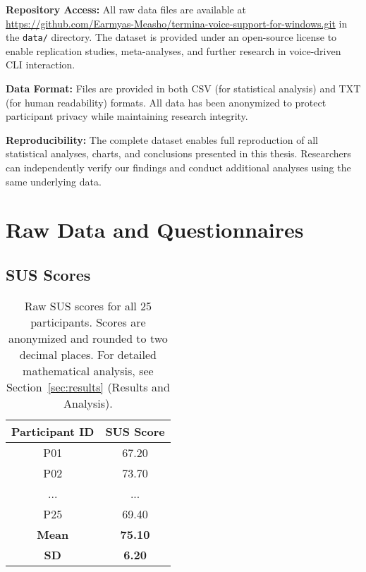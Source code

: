 \documentclass[a4paper,12pt]{article}
\begin{document}
\textbf{Repository Access:} All raw data files are available at \url{https://github.com/Earmyas-Measho/termina-voice-support-for-windows.git} in the \texttt{data/} directory. The dataset is provided under an open-source license to enable replication studies, meta-analyses, and further research in voice-driven CLI interaction.

\textbf{Data Format:} Files are provided in both CSV (for statistical analysis) and TXT (for human readability) formats. All data has been anonymized to protect participant privacy while maintaining research integrity.

\textbf{Reproducibility:} The complete dataset enables full reproduction of all statistical analyses, charts, and conclusions presented in this thesis. Researchers can independently verify our findings and conduct additional analyses using the same underlying data.

\clearpage
\appendix
{}
\setcounter{page}{1} %

\newpage
\section{Raw Data and Questionnaires}
\label{app:rawdata}

\subsection{SUS Scores}
\begin{table}[h!]
\centering
\begin{tabular}{|c|c|}
\hline
\textbf{Participant ID} & \textbf{SUS Score} \\
\hline
P01 & 67.20 \\
P02 & 73.70 \\
... & ... \\
P25 & 69.40 \\
\hline
\textbf{Mean} & \textbf{75.10} \\
\textbf{SD} & \textbf{6.20} \\
\hline
\end{tabular}
\caption{Raw SUS scores for all 25 participants. Scores are anonymized and rounded to two decimal places. For detailed mathematical analysis, see Section~\ref{sec:results} (Results and Analysis).}
\end{table}
\end{document}
